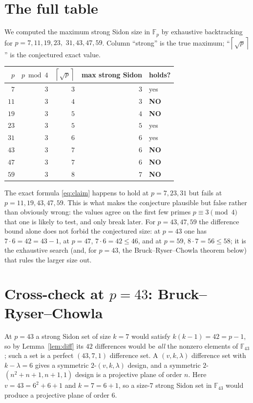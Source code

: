 \documentclass[11pt]{article}
\theoremstyle{definition}
\theoremstyle{remark}
\newcommand{\F}{\mathbb{F}}
\newcommand{\ceil}[1]{\left\lceil #1 \right\rceil}
\begin{document}
\section{The full table}

We computed the maximum strong Sidon size in $\F_p$ by exhaustive backtracking
for $p = 7, 11, 19, 23,$ $31, 43, 47, 59$. Column ``strong'' is the true
maximum; ``$\ceil{\sqrt p}$'' is the conjectured exact value.

\begin{center}
\begin{tabular}{r r r r l}
\toprule
$p$ & $p \bmod 4$ & $\ceil{\sqrt p}$ & max strong Sidon & holds? \\
\midrule
$7$  & $3$ & $3$ & $3$ & yes \\
$11$ & $3$ & $4$ & $3$ & \textbf{NO} \\
$19$ & $3$ & $5$ & $4$ & \textbf{NO} \\
$23$ & $3$ & $5$ & $5$ & yes \\
$31$ & $3$ & $6$ & $6$ & yes \\
$43$ & $3$ & $7$ & $6$ & \textbf{NO} \\
$47$ & $3$ & $7$ & $6$ & \textbf{NO} \\
$59$ & $3$ & $8$ & $7$ & \textbf{NO} \\
\bottomrule
\end{tabular}
\end{center}

The exact formula \eqref{eq:claim} happens to hold at $p = 7, 23, 31$ but fails
at $p = 11, 19, 43, 47, 59$. This is what makes the conjecture plausible but
false rather than obviously wrong: the values agree on the first few primes
$p \equiv 3 \pmod 4$ that one is likely to test, and only break later. For
$p = 43, 47, 59$ the difference bound alone does not forbid the conjectured
size: at $p = 43$ one has $7 \cdot 6 = 42 = 43 - 1$, at $p = 47$,
$7 \cdot 6 = 42 \le 46$, and at $p = 59$, $8 \cdot 7 = 56 \le 58$; it is the
exhaustive search (and, for $p=43$, the Bruck--Ryser--Chowla theorem below)
that rules the larger size out.

\section{Cross-check at $p = 43$: Bruck--Ryser--Chowla}

At $p = 43$ a strong Sidon set of size $k = 7$ would satisfy
$k(k-1) = 42 = p - 1$, so by Lemma~\ref{lem:diff} its $42$ differences would be
\emph{all} the nonzero elements of $\F_{43}$; such a set is a perfect
$(43,7,1)$ difference set. A $(v,k,\lambda)$ difference set with $k-\lambda=6$
gives a symmetric $2$-$(v,k,\lambda)$ design, and a symmetric $2$-$(n^2+n+1,
n+1, 1)$ design is a projective plane of order $n$. Here
$v = 43 = 6^2 + 6 + 1$ and $k = 7 = 6 + 1$, so a size-$7$ strong Sidon set in
$\F_{43}$ would produce a projective plane of order $6$.
\end{document}
